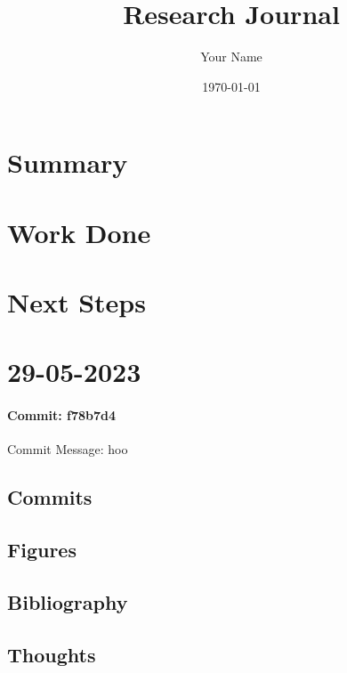 \documentclass{article}
\begin{document}
\title{Research Journal}
\author{Your Name}
\date{\today}

\maketitle

\section{Summary}

\section{Work Done}

\section{Next Steps}


\section{29-05-2023}

\paragraph{Commit: f78b7d4}

Commit Message: hoo

\subsection{Commits}
\subsection{Figures}
\subsection{Bibliography}
\subsection{Thoughts}
\end{document}
